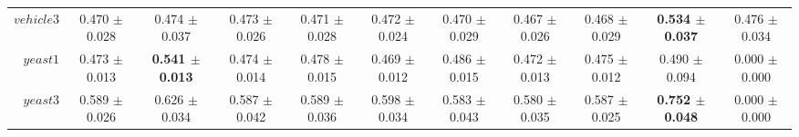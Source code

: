 \begin{table}[!ht]
{\begin{tabular}{r c c c c c c c c c c}
$vehicle3$ & 0.470 $\pm$ 0.028 & 0.474 $\pm$ 0.037 & 0.473 $\pm$ 0.026 & 0.471 $\pm$ 0.028 & 0.472 $\pm$ 0.024 & 0.470 $\pm$ 0.029 & 0.467 $\pm$ 0.026 & 0.468 $\pm$ 0.029 & \textbf{0.534 $\pm$ 0.037} & 0.476 $\pm$ 0.034 \\
$yeast1$ & 0.473 $\pm$ 0.013 & \textbf{0.541 $\pm$ 0.013} & 0.474 $\pm$ 0.014 & 0.478 $\pm$ 0.015 & 0.469 $\pm$ 0.012 & 0.486 $\pm$ 0.015 & 0.472 $\pm$ 0.013 & 0.475 $\pm$ 0.012 & 0.490 $\pm$ 0.094 & 0.000 $\pm$ 0.000 \\
$yeast3$ & 0.589 $\pm$ 0.026 & 0.626 $\pm$ 0.034 & 0.587 $\pm$ 0.042 & 0.589 $\pm$ 0.036 & 0.598 $\pm$ 0.034 & 0.583 $\pm$ 0.043 & 0.580 $\pm$ 0.035 & 0.587 $\pm$ 0.025 & \textbf{0.752 $\pm$ 0.048} & 0.000 $\pm$ 0.000 \\
\end{tabular}}
\end{table}
